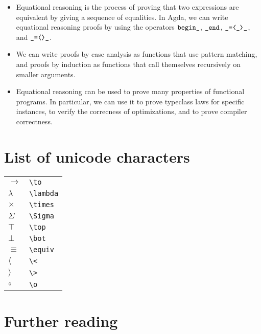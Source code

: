 \documentclass[a4paper,UKenglish]{tufte-handout}
\theoremstyle{definition}
\newcommand\fun[1]{{\AgdaFunction{#1}}}
\begin{document}
\begin{itemize}
  \item Equational reasoning is the process of proving that two
expressions are equivalent by giving a sequence of equalities. In
Agda, we can write equational reasoning proofs by using the operators
$\fun{begin\_}$, $\fun{\_end}$, $\fun{\_=⟨\_⟩\_}$, and
$\fun{\_=⟨⟩\_}$.
  \item We can write proofs by case analysis as functions that use
pattern matching, and proofs by induction as functions that call
themselves recursively on smaller arguments.
  \item Equational reasoning can be used to prove many properties of
functional programs. In particular, we can use it to prove typeclass
laws for specific instances, to verify the correcness of
optimizations, and to prove compiler correctness.
\end{itemize}


\appendix

\section{List of unicode characters}

\begin{tabular}{ll}
$\to$& \texttt{\textbackslash{}to} \\
$\lambda$& \texttt{\textbackslash{}lambda} \\
$\times$& \texttt{\textbackslash{}times} \\
$\Sigma$& \texttt{\textbackslash{}Sigma} \\
$\top$& \texttt{\textbackslash{}top} \\
$\bot$& \texttt{\textbackslash{}bot} \\
$\equiv$& \texttt{\textbackslash{}equiv} \\
$\langle$& \texttt{\textbackslash{}<} \\
$\rangle$& \texttt{\textbackslash{}>} \\
$\circ$& \texttt{\textbackslash{}o} \\
\end{tabular}

\section{Further reading}
\end{document}
